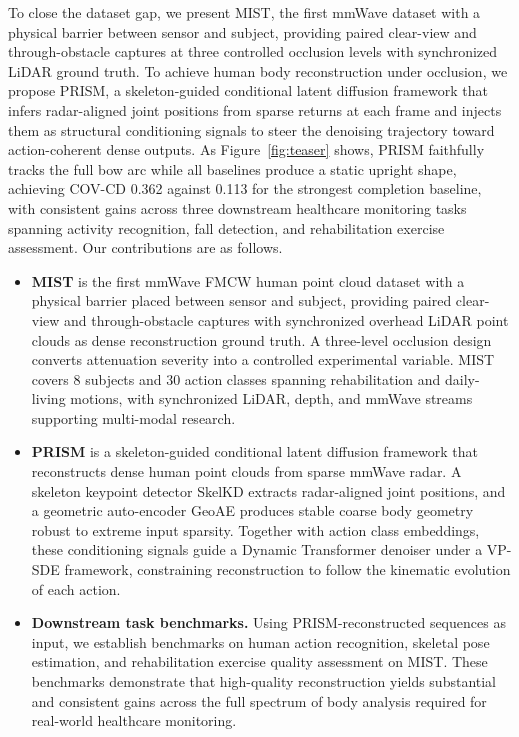 \documentclass{article}
\begin{document}
To close the dataset gap, we present MIST, the first mmWave dataset with a
physical barrier between sensor and subject, providing paired clear-view and
through-obstacle captures at three controlled occlusion levels with synchronized
LiDAR ground truth.
To achieve human body reconstruction under occlusion, we propose PRISM, a
skeleton-guided conditional latent diffusion framework that infers radar-aligned
joint positions from sparse returns at each frame and injects them as structural
conditioning signals to steer the denoising trajectory toward action-coherent
dense outputs.
As Figure~\ref{fig:teaser} shows, PRISM faithfully tracks the full bow arc
while all baselines produce a static upright shape, achieving COV-CD 0.362
against 0.113 for the strongest completion baseline, with consistent gains
across three downstream healthcare monitoring tasks spanning activity
recognition, fall detection, and rehabilitation exercise assessment.
Our contributions are as follows.

\begin{itemize}[leftmargin=1.5em,itemsep=2pt]

  \item \textbf{MIST} is the first mmWave FMCW human point cloud dataset with
  a physical barrier placed between sensor and subject, providing paired
  clear-view and through-obstacle captures with synchronized overhead LiDAR
  point clouds as dense reconstruction ground truth.
  A three-level occlusion design converts attenuation severity into a
  controlled experimental variable.
  MIST covers 8 subjects and 30 action classes spanning rehabilitation and
  daily-living motions, with synchronized LiDAR, depth, and mmWave streams
  supporting multi-modal research.

  \item \textbf{PRISM} is a skeleton-guided conditional latent diffusion
  framework that reconstructs dense human point clouds from sparse mmWave
  radar.
  A skeleton keypoint detector SkelKD extracts radar-aligned joint positions,
  and a geometric auto-encoder GeoAE produces stable coarse body geometry
  robust to extreme input sparsity.
  Together with action class embeddings, these conditioning signals guide a
  Dynamic Transformer denoiser under a VP-SDE framework, constraining
  reconstruction to follow the kinematic evolution of each action.

  \item \textbf{Downstream task benchmarks.}
  Using PRISM-reconstructed sequences as input, we establish benchmarks on
  human action recognition, skeletal pose estimation, and rehabilitation
  exercise quality assessment on MIST.
  These benchmarks demonstrate that high-quality reconstruction yields
  substantial and consistent gains across the full spectrum of body analysis
  required for real-world healthcare monitoring.

\end{itemize}
\end{document}
